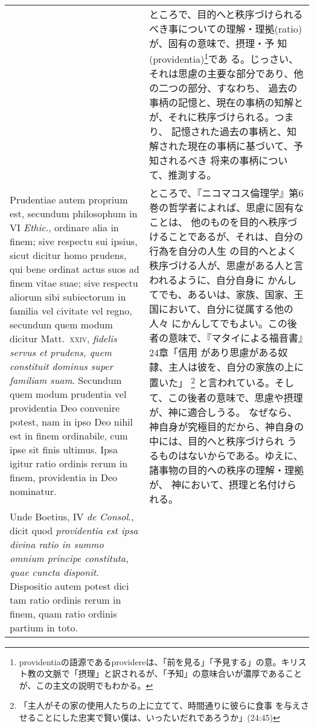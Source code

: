 \documentclass[10pt]{jsarticle} %
\begin{document}
\begin{longtable}{p{21em}p{21em}}
&

ところで、目的へと秩序づけられるべき事についての理解・理拠(ratio)が、固有の意味で、摂理・予
 知(providentia)\footnote{providentiaの語源であるprovidereは、「前を見る」「予見する」の意。キリスト教の文脈で「摂理」と訳されるが、「予知」の意味合いが濃厚であることが、この主文の説明でもわかる。}であ
 る。じっさい、それは思慮の主要な部分であり、他の二つの部分、すなわち、
 過去の事柄の記憶と、現在の事柄の知解とが、それに秩序づけられる。つまり、
 記憶された過去の事柄と、知解された現在の事柄に基づいて、予知されるべき
 将来の事柄について、推測する。

\\

Prudentiae autem
proprium est, secundum philosophum in VI {\itshape Ethic}., ordinare alia in finem;
sive respectu sui ipsius, sicut dicitur homo prudens, qui bene ordinat
actus suos ad finem vitae suae; sive respectu aliorum sibi subiectorum
in familia vel civitate vel regno, secundum quem modum dicitur
Matt.~{\scshape xxiv}, {\itshape fidelis servus et prudens, quem constituit dominus super
familiam suam}. Secundum quem modum prudentia vel providentia Deo
convenire potest, nam in ipso Deo nihil est in finem ordinabile, cum
ipse sit finis ultimus. Ipsa igitur ratio ordinis rerum in finem,
providentia in Deo nominatur. 
&

ところで、『ニコマコス倫理学』第6巻の哲学者によれば、思慮に固有なことは、
 他のものを目的へ秩序づけることであるが、それは、自分の行為を自分の人生
 の目的へとよく秩序づける人が、思慮がある人と言われるように、自分自身に
 かんしてでも、あるいは、家族、国家、王国において、自分に従属する他の人々
 にかんしてでもよい。この後者の意味で、『マタイによる福音書』24章「信用
 があり思慮がある奴隷、主人は彼を、自分の家族の上に置いた」
 \footnote{「主人がその家の使用人たちの上に立てて、時間通りに彼らに食事
 を与えさせることにした忠実で賢い僕は、いったいだれであろうか」(24:45)}
 と言われている。そして、この後者の意味で、思慮や摂理が、神に適合しうる。
 なぜなら、神自身が究極目的だから、神自身の中には、目的へと秩序づけられ
 うるものはないからである。ゆえに、諸事物の目的への秩序の理解・理拠が、
 神において、摂理と名付けられる。


\\

Unde Boetius, IV {\itshape de Consol}., dicit quod
{\itshape providentia est ipsa divina ratio in summo omnium principe constituta,
quae cuncta disponit}. Dispositio autem potest dici tam ratio ordinis
rerum in finem, quam ratio ordinis partium in toto.


\end{longtable}
\end{document}

